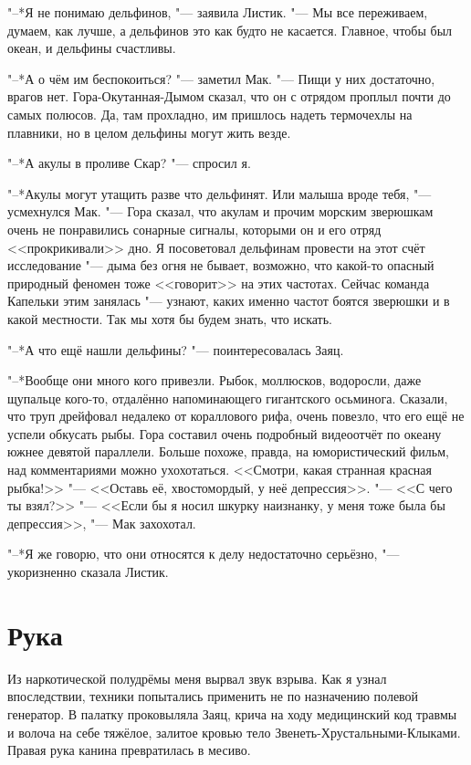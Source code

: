 \documentclass[a4paper,10pt]{book}
\begin{document}
"--*Я не понимаю дельфинов, "--- заявила Листик. "--- Мы все переживаем, 
думаем, 
как лучше, а дельфинов это как будто не касается. Главное, чтобы был океан, и 
дельфины счастливы.

"--*А о чём им беспокоиться? "--- заметил Мак. "--- Пищи у них достаточно, 
врагов 
нет. Гора-Окутанная-Дымом сказал, что он с отрядом проплыл почти до самых 
полюсов. Да, там прохладно, им пришлось надеть термочехлы на плавники, но в 
целом дельфины могут жить везде.

"--*А акулы в проливе Скар? "--- спросил я.

"--*Акулы могут утащить разве что дельфинят. Или малыша вроде тебя, "--- 
усмехнулся Мак. "--- Гора сказал, что акулам и прочим морским зверюшкам очень 
не 
понравились сонарные сигналы, которыми он и его отряд <<прокрикивали>> дно. Я 
посоветовал дельфинам провести на этот счёт исследование "--- дыма без огня не 
бывает, возможно, что какой-то опасный природный феномен тоже <<говорит>> на 
этих частотах. Сейчас команда Капельки этим занялась "--- узнают, каких именно 
частот боятся зверюшки и в какой местности. Так мы хотя бы будем знать, что 
искать.

"--*А что ещё нашли дельфины? "--- поинтересовалась Заяц.

"--*Вообще они много кого привезли. Рыбок, моллюсков, водоросли, даже щупальце 
кого-то, отдалённо напоминающего гигантского осьминога. Сказали, что труп 
дрейфовал недалеко от кораллового рифа, очень повезло, что его ещё не успели 
обкусать рыбы. Гора составил очень подробный видеоотчёт по океану южнее девятой 
параллели. Больше похоже, правда, на юмористический фильм, над комментариями 
можно ухохотаться. <<Смотри, какая странная красная рыбка!>> "--- <<Оставь её, 
хвостомордый, у неё депрессия>>. "--- <<С чего ты взял?>> "--- <<Если бы я 
носил 
шкурку наизнанку, у меня тоже была бы депрессия>>, "--- Мак захохотал.

"--*Я же говорю, что они относятся к делу недостаточно серьёзно, "--- 
укоризненно сказала Листик.

\section{Рука}

Из наркотической полудрёмы меня вырвал звук взрыва. Как я узнал впоследствии, 
техники попытались применить не по назначению полевой генератор. В палатку 
проковыляла Заяц, крича на ходу медицинский код травмы и волоча на себе 
тяжёлое, залитое кровью тело Звенеть-Хрустальными-Клыками. Правая рука канина 
превратилась в месиво.
\end{document}
